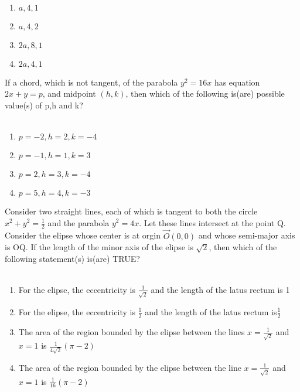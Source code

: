 \documentclass[journal,12pt,twocolumn]{IEEEtran}
\theoremstyle{remark}
\begin{document}
	      \\
	      \begin{enumerate}
		      \item $a,4,1$
		      \item $a,4,2$
		      \item $2a,8,1$
		      \item $2a,4,1$
	      \end{enumerate}
      \item If a chord, which is not tangent, of the parabola $y^2=16x$ has equation $2x+y=p$, and midpoint $(h,k)$, then which of the following is(are) possible value(s) of p,h and k? \\
	      \hfill{}
	      \\
	      \begin{enumerate}
		      \item $p=-2,h=2,k=-4$
		      \item $p=-1,h=1,k=3$
		      \item $p=2,h=3,k=-4$
		      \item $p=5,h=4,k=-3$


	      \end{enumerate}
      \item Consider two straight lines, each of which is tangent to both the circle $x^2+y^2=\frac{1}{2}$
	      and the parabola $y^2=4x$. Let these lines intersect at the point Q. Consider the elipse whose center is at orgin $\vec{O}(0,0)$ and whose semi-major axis is OQ.
	      If the length of the minor axis of the elipse is $\sqrt{2}$, then which of the following statement(s) is(are) TRUE? \\
	      \hfill{}
	      \\
	      \begin{enumerate}
		      \item For the elipse, the eccentricity is $\frac{1}{\sqrt{2}}$ and the length of the latus rectum is 1

		      \item For the elipse, the eccentricity is $\frac{1}{2}$ and the length of the latus rectum is$\frac{1}{2}$
		      \item The area of the region bounded by the elipse between the lines $x=\frac{1}{\sqrt{2}}$ and $x=1$ is $\frac{1}{4\sqrt{2}}(\pi-2)$
		      \item The area of the region bounded by the elipse between the line $x=\frac{1}{\sqrt{2}}$ and $x=1$ is $\frac{1}{16}(\pi-2)$
	      \end{enumerate}
\end{document}
